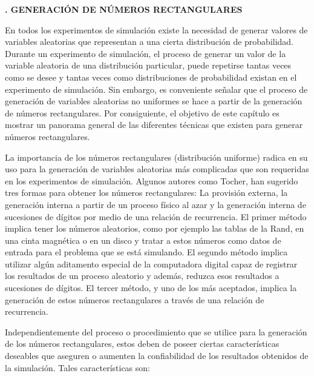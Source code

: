 \documentclass[11pt,letterpaper]{report}
\begin{document}
\begin{center}
{\LARGE\bfseries\linespread{1.3}. GENERACIÓN DE NÚMEROS RECTANGULARES\par}
\end{center}
\vspace{0.5cm}

\setcounter{chapter}{2}
\setcounter{page}{19}

En todos los experimentos de simulación existe la necesidad de generar
valores de variables aleatorias que representan a una cierta
distribución de probabilidad. Durante un experimento de simulación, el
proceso de generar un valor de la variable aleatoria de una distribución
particular, puede repetirse tantas veces como se desee y tantas veces
como distribuciones de probabilidad existan en el experimento de
simulación. Sin embargo, es conveniente señalar que el proceso de
generación de variables aleatorias no uniformes se hace a partir de la
generación de números rectangulares. Por consiguiente, el objetivo de
este capítulo es mostrar un panorama general de las diferentes técnicas
que existen para generar números rectangulares.

La importancia de los números rectangulares (distribución uniforme)
radica en su uso para la generación de variables aleatorias más
complicadas que son requeridas en los experimentos de simulación.
Algunos autores como Tocher, han sugerido tres formas para obtener los
números rectangulares: La provisión externa, la generación interna a
partir de un proceso físico al azar y la generación interna de
sucesiones de dígitos por medio de una relación de recurrencia. El
primer método implica tener los números aleatorios, como por ejemplo las
tablas de la Rand, en una cinta magnética o en un disco y tratar a estos
números como datos de entrada para el problema que se está simulando.
El segundo método implica utilizar algún aditamento especial de la
computadora digital capaz de registrar los resultados de un proceso
aleatorio y además, reduzca esos resultados a sucesiones de dígitos. El
tercer método, y uno de los más aceptados, implica la generación de
estos números rectangulares a través de una relación de recurrencia.

Independientemente del proceso o procedimiento que se utilice para la
generación de los números rectangulares, estos deben de poseer ciertas
características deseables que aseguren o aumenten la confiabilidad de
los resultados obtenidos de la simulación. Tales características son:
\end{document}
